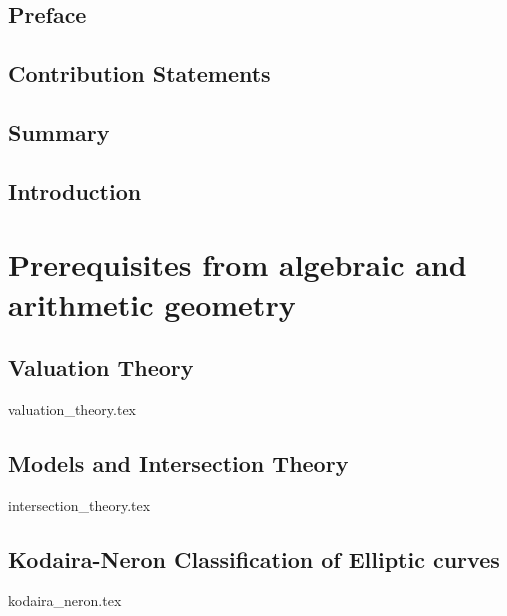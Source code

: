 


\rmfamily
\setcounter{page}{0}
\newpage
\chapter*{Preface} \label{chap:preface}
\chapter*{Contribution Statements} \label{chap:acknowledgements}
\chapter*{Summary} \label{chap:introduction}

\myprintnomenclature
\tableofcontents
\listoftodos


\setcounter{page}{0}

\chapter{Introduction} \label{chap:introduction}


\part{Prerequisites from algebraic and arithmetic geometry}
\chapter{Valuation Theory} \label{chap:valuation_theory}
{valuation_theory.tex}



\chapter{Models and Intersection Theory} \label{chap:models_and_intersection_theory}
{intersection_theory.tex}

\chapter{Kodaira-Neron Classification of Elliptic curves} \label{chap:kodaira_neron_classification_of_elliptic_curves}
{kodaira_neron.tex}

